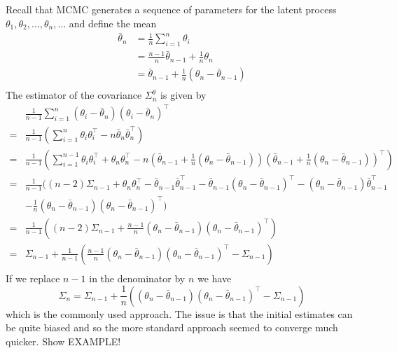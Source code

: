 \documentclass[11pt]{amsart}
\begin{document}
Recall that MCMC generates a sequence of parameters for the latent process $\theta_1, \theta_2, \ldots, \theta_n, \ldots$ and define the mean
$$
\begin{aligned}
\bar \theta_n &= \frac{1}{n} \sum_{i=1}^n \theta_i \\
&= \frac{n-1}{n} \bar \theta_{n-1} + \frac{1}{n} \theta_n \\
&= \bar \theta_{n-1} + \frac{1}{n} (\theta_n - \bar \theta_{n-1}) \\
\end{aligned}
$$
The estimator of the covariance $\Sigma_n^\theta$ is given by
$$
\begin{aligned}
&\frac{1}{n-1} \sum_{i=1}^n \left( \theta_i - \bar \theta_n \right) \left( \theta_i - \bar \theta_n \right)^\top \\
=& \frac{1}{n-1} \left( \sum_{i=1}^n \theta_i \theta_i^\top - n \bar \theta_n \bar \theta_n^\top \right) \\
=& \frac{1}{n-1} \left( \sum_{i=1}^{n-1} \theta_i \theta_i^\top + \theta_n \theta_n^\top - n \left( \bar \theta_{n-1} + \frac{1}{n} (\theta_n - \bar \theta_{n-1}) \right) \left( \bar \theta_{n-1} + \frac{1}{n} (\theta_n - \bar \theta_{n-1}) \right)^\top \right) \\
=& \frac{1}{n-1} \bigg( (n-2) \Sigma_{n-1} + \theta_n \theta_n^\top - \bar \theta_{n-1} \bar \theta_{n-1}^\top - \bar \theta_{n-1}  (\theta_n - \bar \theta_{n-1} )^\top - (\theta_n - \bar \theta_{n-1} ) \bar \theta_{n-1}^\top \\
&- \frac{1}{n} (\theta_n - \bar \theta_{n-1} ) (\theta_n - \bar \theta_{n-1} )^\top \bigg) \\
=& \frac{1}{n-1} \left( (n-2) \Sigma_{n-1} + \frac{n-1}{n} (\theta_n - \bar \theta_{n-1} ) (\theta_n - \bar \theta_{n-1} )^\top \right) \\
=& \Sigma_{n-1} + \frac{1}{n-1} \left(  \frac{n-1}{n} (\theta_n - \bar \theta_{n-1} ) (\theta_n - \bar \theta_{n-1} )^\top  - \Sigma_{n-1} \right) \\
\end{aligned}
$$
If we replace $n-1$ in the denominator by $n$ we have
$$
\Sigma_n = \Sigma_{n-1} + \frac{1}{n} \left(  (\theta_n - \bar \theta_{n-1} ) (\theta_n - \bar \theta_{n-1} )^\top  - \Sigma_{n-1} \right)
$$
which is the commonly used approach.  The issue is that the initial estimates can be quite biased and so the more standard approach seemed to converge much quicker.  Show EXAMPLE!
\end{document}
